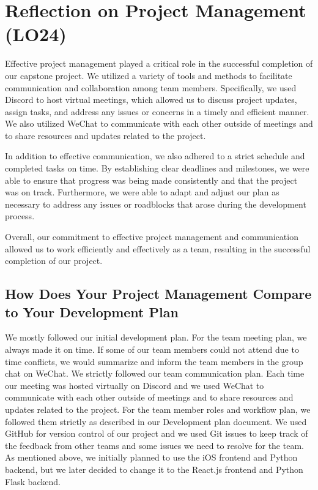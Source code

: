 \documentclass{article}
\begin{document}
\section{Reflection on Project Management (LO24)}
Effective project management played a critical role in the successful completion of our capstone project. We utilized a variety of tools and methods to facilitate communication and collaboration among team members. Specifically, we used Discord to host virtual meetings, which allowed us to discuss project updates, assign tasks, and address any issues or concerns in a timely and efficient manner. We also utilized WeChat to communicate with each other outside of meetings and to share resources and updates related to the project.

In addition to effective communication, we also adhered to a strict schedule and completed tasks on time. By establishing clear deadlines and milestones, we were able to ensure that progress was being made consistently and that the project was on track. Furthermore, we were able to adapt and adjust our plan as necessary to address any issues or roadblocks that arose during the development process.

Overall, our commitment to effective project management and communication allowed us to work efficiently and effectively as a team, resulting in the successful completion of our project.

\subsection{How Does Your Project Management Compare to Your Development Plan}

We mostly followed our initial development plan. For the team meeting plan, we always made it on time. If some of our team members could not attend due to time conflicts, we would summarize and inform the team members in the group chat on WeChat. We strictly followed our team communication plan. Each time our meeting was hosted virtually on Discord and we used WeChat to communicate with each other outside of meetings and to share resources and updates related to the project. For the team member roles and workflow plan, we followed them strictly as described in our Development plan document. We used GitHub for version control of our project and we used Git issues to keep track of the feedback from other teams and some issues we need to resolve for the team. As mentioned above, we initially planned to use the iOS frontend and Python backend, but we later decided to change it to the React.js frontend and Python Flask backend.
\end{document}
